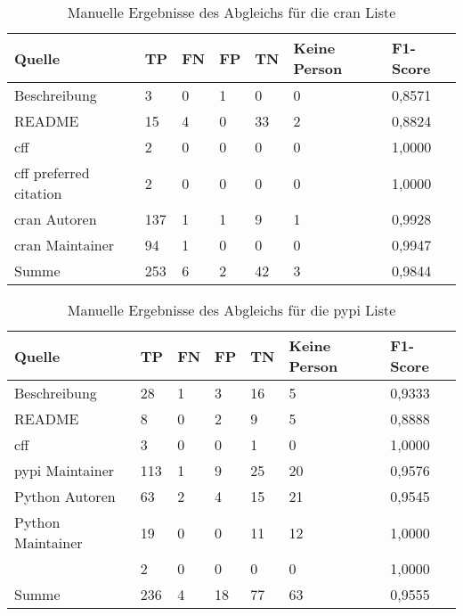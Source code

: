 \begin{table}[H]
    \centering
    \begin{tabularx}{\textwidth}{XR{.7cm}R{.7cm}R{.7cm}R{.7cm}R{2.8cm}R{2cm}}
        \toprule
        \textbf{Quelle} & \textbf{TP} & \textbf{FN} & \textbf{FP} & \textbf{TN} & \textbf{Keine Person} & \textbf{F1-Score} \\ \midrule
        Beschreibung                 & 3   & 0 & 1 & 0  & 0 & 0,8571 \\
        README                       & 15  & 4 & 0 & 33 & 2 & 0,8824 \\
        \gls{cff}                    & 2   & 0 & 0 & 0  & 0 & 1,0000 \\
        \gls{cff} preferred citation & 2   & 0 & 0 & 0  & 0 & 1,0000 \\
        \gls{cran} Autoren           & 137 & 1 & 1 & 9  & 1 & 0,9928 \\
        \gls{cran} Maintainer        & 94  & 1 & 0 & 0  & 0 & 0,9947 \\ \midrule
        Summe                        & 253 & 6 & 2 & 42 & 3 & 0,9844 \\
        \bottomrule
    \end{tabularx}
    \caption{Manuelle Ergebnisse des Abgleichs für die \gls{cran} Liste}
    \label{tab:cran_matching_results_manual_anhang}
\end{table}

\begin{table}[H]
    \centering
    \begin{tabularx}{\textwidth}{XR{.7cm}R{.7cm}R{.7cm}R{.7cm}R{2.8cm}R{2cm}}
        \toprule
        \textbf{Quelle} & \textbf{TP} & \textbf{FN} & \textbf{FP} & \textbf{TN} & \textbf{Keine Person} & \textbf{F1-Score} \\ \midrule
        Beschreibung                 & 28  & 1 & 3  & 16 & 5  & 0,9333 \\
        README                       & 8   & 0 & 2  & 9  & 5  & 0,8888 \\
        \gls{cff}                    & 3   & 0 & 0  & 1  & 0  & 1,0000 \\
        \gls{pypi} Maintainer        & 113 & 1 & 9  & 25 & 20 & 0,9576 \\
        Python Autoren               & 63  & 2 & 4  & 15 & 21 & 0,9545 \\
        Python Maintainer            & 19  & 0 & 0  & 11 & 12 & 1,0000 \\
                      & 2   & 0 & 0  & 0  & 0  & 1,0000 \\ \midrule
        Summe                        & 236 & 4 & 18 & 77 & 63 & 0,9555 \\
        \bottomrule
    \end{tabularx}
    \caption{Manuelle Ergebnisse des Abgleichs für die \gls{pypi} Liste}
    \label{tab:pypi_matching_results_manual_anhang}
\end{table}


